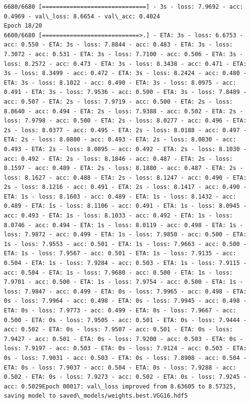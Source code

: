 \documentclass[11pt]{article}
\begin{document}
\begin{Verbatim}[commandchars=\\\{\}]
6680/6680 [==============================] - 3s - loss: 7.9692 - acc: 0.4969 - val\_loss: 8.6654 - val\_acc: 0.4024
Epoch 18/20
6600/6680 [============================>.] - ETA: 3s - loss: 6.6753 - acc: 0.550 - ETA: 3s - loss: 7.8844 - acc: 0.483 - ETA: 3s - loss: 7.3072 - acc: 0.531 - ETA: 3s - loss: 7.7100 - acc: 0.506 - ETA: 3s - loss: 8.2572 - acc: 0.473 - ETA: 3s - loss: 8.3438 - acc: 0.471 - ETA: 3s - loss: 8.3499 - acc: 0.472 - ETA: 3s - loss: 8.2424 - acc: 0.480 - ETA: 3s - loss: 8.1022 - acc: 0.490 - ETA: 3s - loss: 8.0975 - acc: 0.491 - ETA: 3s - loss: 7.9536 - acc: 0.500 - ETA: 3s - loss: 7.8489 - acc: 0.507 - ETA: 2s - loss: 7.9719 - acc: 0.500 - ETA: 2s - loss: 8.0640 - acc: 0.494 - ETA: 2s - loss: 7.9388 - acc: 0.502 - ETA: 2s - loss: 7.9798 - acc: 0.500 - ETA: 2s - loss: 8.0277 - acc: 0.496 - ETA: 2s - loss: 8.0377 - acc: 0.495 - ETA: 2s - loss: 8.0188 - acc: 0.497 - ETA: 2s - loss: 8.0800 - acc: 0.493 - ETA: 2s - loss: 8.0830 - acc: 0.493 - ETA: 2s - loss: 8.0895 - acc: 0.492 - ETA: 2s - loss: 8.1030 - acc: 0.492 - ETA: 2s - loss: 8.1846 - acc: 0.487 - ETA: 2s - loss: 8.1597 - acc: 0.489 - ETA: 2s - loss: 8.1880 - acc: 0.487 - ETA: 2s - loss: 8.1627 - acc: 0.488 - ETA: 2s - loss: 8.1247 - acc: 0.490 - ETA: 2s - loss: 8.1216 - acc: 0.491 - ETA: 2s - loss: 8.1417 - acc: 0.490 - ETA: 1s - loss: 8.1603 - acc: 0.489 - ETA: 1s - loss: 8.1432 - acc: 0.489 - ETA: 1s - loss: 8.1106 - acc: 0.491 - ETA: 1s - loss: 8.0945 - acc: 0.493 - ETA: 1s - loss: 8.1033 - acc: 0.492 - ETA: 1s - loss: 8.0746 - acc: 0.494 - ETA: 1s - loss: 8.0119 - acc: 0.498 - ETA: 1s - loss: 7.9872 - acc: 0.499 - ETA: 1s - loss: 7.9850 - acc: 0.500 - ETA: 1s - loss: 7.9553 - acc: 0.501 - ETA: 1s - loss: 7.9663 - acc: 0.500 - ETA: 1s - loss: 7.9567 - acc: 0.501 - ETA: 1s - loss: 7.9135 - acc: 0.504 - ETA: 1s - loss: 7.9284 - acc: 0.503 - ETA: 1s - loss: 7.9115 - acc: 0.504 - ETA: 1s - loss: 7.9680 - acc: 0.500 - ETA: 1s - loss: 7.9701 - acc: 0.500 - ETA: 1s - loss: 7.9754 - acc: 0.500 - ETA: 1s - loss: 7.9847 - acc: 0.499 - ETA: 0s - loss: 7.9965 - acc: 0.498 - ETA: 0s - loss: 7.9964 - acc: 0.498 - ETA: 0s - loss: 7.9945 - acc: 0.498 - ETA: 0s - loss: 7.9773 - acc: 0.499 - ETA: 0s - loss: 7.9667 - acc: 0.500 - ETA: 0s - loss: 7.9505 - acc: 0.501 - ETA: 0s - loss: 7.9444 - acc: 0.502 - ETA: 0s - loss: 7.9507 - acc: 0.501 - ETA: 0s - loss: 7.9427 - acc: 0.501 - ETA: 0s - loss: 7.9200 - acc: 0.503 - ETA: 0s - loss: 7.9197 - acc: 0.503 - ETA: 0s - loss: 7.9124 - acc: 0.503 - ETA: 0s - loss: 7.9031 - acc: 0.503 - ETA: 0s - loss: 7.8908 - acc: 0.504 - ETA: 0s - loss: 7.9037 - acc: 0.504 - ETA: 0s - loss: 7.9288 - acc: 0.502 - ETA: 0s - loss: 7.9273 - acc: 0.502 - ETA: 0s - loss: 7.9245 - acc: 0.5029Epoch 00017: val\_loss improved from 8.63605 to 8.57325, saving model to saved\_models/weights.best.VGG16.hdf5

\end{Verbatim}
\end{document}
